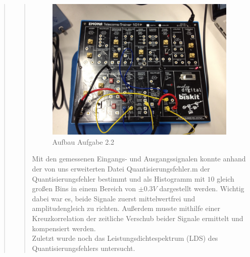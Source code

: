 \begin{quote}
\begin{quote}
       \begin{figure}[H]
            \centering
                \includegraphics[scale=0.17, trim = 0cm 0cm 0cm 0cm,
                clip]{./Bilder/Aufgabe_2_2}
                    \caption{Aufbau Aufgabe 2.2}
       \end{figure}
       
       Mit den gemessenen Eingangs- und Ausgangssignalen konnte anhand der von
       uns erweiterten Datei Quantisierungsfehler.m der Quantisierungsfehler
       bestimmt und als Histogramm mit $10$ gleich großen Bins in
       einem Bereich von $\pm 0.3V$ dargestellt werden. Wichtig dabei war es,
       beide Signale zuerst mittelwertfrei und amplitudengleich zu richten.
       Außerdem musste mithilfe einer Kreuzkorrelation der zeitliche Verschub
       beider Signale ermittelt und kompensiert werden.\\
       
       Zuletzt wurde noch das Leistungsdichtespektrum (LDS) des
       Quantisierungsfehlers untersucht.
       
    \end{quote}  %

\end{quote}%


    
